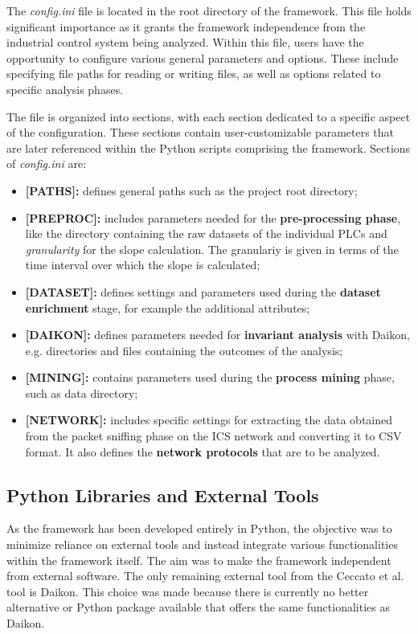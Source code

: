 The \textit{config.ini} file is located in the root directory of the framework. This file holds significant importance as it grants the framework independence from the industrial control system being analyzed. Within this file, users have the opportunity to configure various general parameters and options. These include specifying file paths for reading or writing files, as well as options related to specific analysis phases.

The file is organized into sections, with each section dedicated to a specific aspect of the configuration. These sections contain user-customizable parameters that are later referenced within the Python scripts comprising the framework. Sections of \textit{config.ini} are:

\begin{itemize}
	\item \textbf{[PATHS]:} defines general paths such as the project root directory;
	
	\item \textbf{[PREPROC]:} includes parameters needed for the \textbf{pre-processing phase}, like the directory containing the raw datasets of the individual PLCs and \textit{granularity} for the slope calculation. The granulariy is given in terms of the time interval over which the slope is calculated;
	
	\item \textbf{[DATASET]:} defines settings and parameters used during the \textbf{dataset enrichment} stage, for example the additional attributes;
	
	\item \textbf{[DAIKON]:} defines parameters needed for \textbf{invariant analysis} with Daikon, e.g. directories and files containing the outcomes of the analysis;
	
	\item \textbf{[MINING]:} contains parameters used during the \textbf{process mining} phase, such as data directory;
	
	\item \textbf{[NETWORK]:} includes specific settings for extracting the data obtained from the packet sniffing phase on the ICS network and converting it to CSV format. It also defines the \textbf{network protocols} that are to be analyzed.
\end{itemize}

\subsection{Python Libraries and External Tools}
\label{subsec:4_tools_libraries}
As the framework has been developed entirely in Python, the objective was to minimize reliance on external tools and instead integrate various functionalities within the framework itself. The aim was to make the framework independent from external software. The only remaining external tool from the Ceccato et al. tool is Daikon. This choice was made because there is currently no better alternative or Python package available that offers the same functionalities as Daikon.

